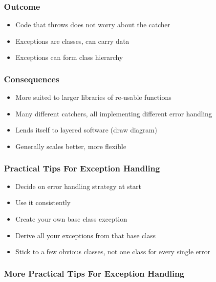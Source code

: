 \subsubsection{Outcome}\label{outcome-1}

\begin{itemize}
\itemsep1pt\parskip0pt
\item
  Code that throws does not worry about the catcher
\item
  Exceptions are classes, can carry data
\item
  Exceptions can form class hierarchy
\end{itemize}

\subsubsection{Consequences}\label{consequences}

\begin{itemize}
\itemsep1pt\parskip0pt
\item
  More suited to larger libraries of re-usable functions
\item
  Many different catchers, all implementing different error handling
\item
  Lends itself to layered software (draw diagram)
\item
  Generally scales better, more flexible
\end{itemize}

\subsubsection{Practical Tips For Exception
Handling}\label{practical-tips-for-exception-handling}

\begin{itemize}
\itemsep1pt\parskip0pt
\item
  Decide on error handling strategy at start
\item
  Use it consistently
\item
  Create your own base class exception
\item
  Derive all your exceptions from that base class
\item
  Stick to a few obvious classes, not one class for every single error
\end{itemize}

\subsubsection{More Practical Tips For Exception
Handling}\label{more-practical-tips-for-exception-handling}

